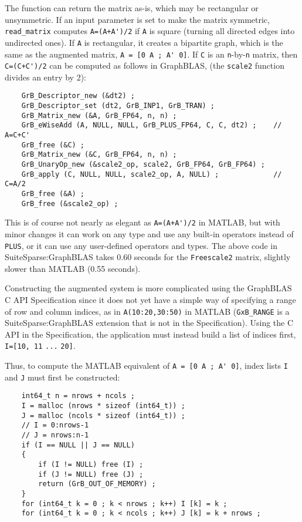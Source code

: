 \documentclass[12pt]{article}
\begin{document}
{The function can return the matrix as-is, which may be rectangular or
unsymmetric.  If an input parameter is set to make the matrix symmetric,
\verb'read_matrix' computes \verb"A=(A+A')/2" if \verb'A' is square (turning
all directed edges into undirected ones).  If \verb'A' is rectangular, it
creates a bipartite graph, which is the same as the augmented matrix,
\verb"A = [0 A ; A' 0]".
If \verb'C' is an \verb'n'-by-\verb'n' matrix, then \verb"C=(C+C')/2" can be
computed as follows in GraphBLAS, (the \verb'scale2' function divides an entry
by 2):

    \vspace{-0.05in}
    {\footnotesize
    \begin{verbatim}
    GrB_Descriptor_new (&dt2) ;
    GrB_Descriptor_set (dt2, GrB_INP1, GrB_TRAN) ;
    GrB_Matrix_new (&A, GrB_FP64, n, n) ;
    GrB_eWiseAdd (A, NULL, NULL, GrB_PLUS_FP64, C, C, dt2) ;    // A=C+C'
    GrB_free (&C) ;
    GrB_Matrix_new (&C, GrB_FP64, n, n) ;
    GrB_UnaryOp_new (&scale2_op, scale2, GrB_FP64, GrB_FP64) ;
    GrB_apply (C, NULL, NULL, scale2_op, A, NULL) ;             // C=A/2
    GrB_free (&A) ;
    GrB_free (&scale2_op) ; \end{verbatim}}

This is of course not nearly as elegant as \verb"A=(A+A')/2" in MATLAB, but
with minor changes it can work on any type and use any built-in operators
instead of \verb'PLUS', or it can use any user-defined operators and types.
The above code in SuiteSparse:GraphBLAS takes 0.60 seconds for the
\verb'Freescale2' matrix, slightly slower than MATLAB (0.55 seconds).

Constructing the augmented system is more complicated using the GraphBLAS C API
Specification since it does not yet have a simple way of specifying a range of
row and column indices, as in \verb'A(10:20,30:50)' in MATLAB (\verb'GxB_RANGE'
is a SuiteSparse:GraphBLAS extension that is not in the Specification).  Using
the C API in the Specification, the application must instead build a list of
indices first, \verb'I=[10, 11' \verb'...' \verb'20]'.

Thus, to compute the MATLAB equivalent of \verb"A = [0 A ; A' 0]", index lists
\verb'I' and \verb'J' must first be constructed:

    \vspace{-0.05in}
    {\footnotesize
    \begin{verbatim}
    int64_t n = nrows + ncols ;
    I = malloc (nrows * sizeof (int64_t)) ;
    J = malloc (ncols * sizeof (int64_t)) ;
    // I = 0:nrows-1
    // J = nrows:n-1
    if (I == NULL || J == NULL)
    {
        if (I != NULL) free (I) ;
        if (J != NULL) free (J) ;
        return (GrB_OUT_OF_MEMORY) ;
    }
    for (int64_t k = 0 ; k < nrows ; k++) I [k] = k ;
    for (int64_t k = 0 ; k < ncols ; k++) J [k] = k + nrows ; \end{verbatim}}

}
\end{document}
